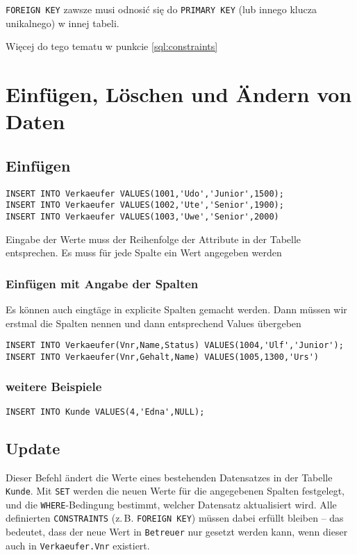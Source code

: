\begin{tcolorbox}[red, title={Hinweis}]
    \texttt{FOREIGN KEY} zawsze musi odnosić się do \texttt{PRIMARY KEY} (lub innego klucza unikalnego) w innej tabeli.
\end{tcolorbox}

Więcej do tego tematu w punkcie \autoref{sql:constraints}

\section{Einfügen, Löschen und Ändern von Daten}
\subsection{Einfügen}
\begin{lstlisting}[style=sqlstyle]
INSERT INTO Verkaeufer VALUES(1001,'Udo','Junior',1500);
INSERT INTO Verkaeufer VALUES(1002,'Ute','Senior',1900);
INSERT INTO Verkaeufer VALUES(1003,'Uwe','Senior',2000)
\end{lstlisting}

Eingabe der Werte muss der Reihenfolge der Attribute in der Tabelle entsprechen. Es muss für jede Spalte ein Wert angegeben werden

\subsubsection{Einfügen mit Angabe der Spalten}
Es können auch eingtäge in explicite Spalten gemacht werden. Dann müssen wir erstmal die Spalten nennen und dann entsprechend Values übergeben
\begin{lstlisting}[style=sqlstyle]
INSERT INTO Verkaeufer(Vnr,Name,Status) VALUES(1004,'Ulf','Junior');
INSERT INTO Verkaeufer(Vnr,Gehalt,Name) VALUES(1005,1300,'Urs')
\end{lstlisting}

\subsubsection{weitere Beispiele}

\begin{lstlisting}[style=sqlstyle]
INSERT INTO Kunde VALUES(4,'Edna',NULL);
\end{lstlisting}

\subsection{Update}
Dieser Befehl ändert die Werte eines bestehenden Datensatzes in der Tabelle \texttt{Kunde}.  
Mit \texttt{SET} werden die neuen Werte für die angegebenen Spalten festgelegt,  
und die \texttt{WHERE}-Bedingung bestimmt, welcher Datensatz aktualisiert wird.  
Alle definierten \texttt{CONSTRAINTS} (z.\,B. \texttt{FOREIGN KEY}) müssen dabei erfüllt bleiben – 
das bedeutet, dass der neue Wert in \texttt{Betreuer} nur gesetzt werden kann, 
wenn dieser auch in \texttt{Verkaeufer.Vnr} existiert.

